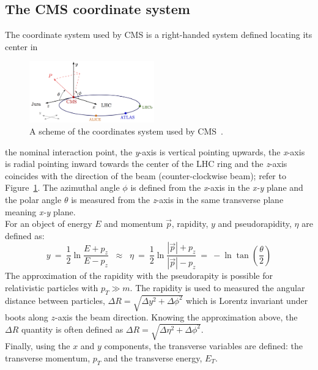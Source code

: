 \subsection{The CMS coordinate system} 
The coordinate system used by CMS is a right-handed system defined
locating its center in
\begin{figure}
  \begin{center}
    \includegraphics[clip,trim=0cm 0cm 0cm 0.1cm, width=0.48\textwidth]{Figures/c2/cms_coordinate_system.png}
  \end{center}
  \caption{A scheme of the coordinates system used by CMS~\cite{coordinate_cms}.}
\label{fig:coordinates}
\end{figure}
 the nominal interaction point, the
\emph{y}-axis is vertical pointing upwards, the \emph{x}-axis is
radial pointing inward towards the center of the LHC ring and the
\emph{z}-axis coincides with the direction of the beam
(counter-clockwise beam); refer to
Figure~\ref{fig:coordinates}. The azimuthal angle $\phi$ is defined
from the \emph{x}-axis in the \emph{x-y} plane and the polar angle
$\theta$ is measured from the \emph{z}-axis in the same transverse
plane meaning \emph{x-y} plane.\\
For an object of energy $E$ and momentum $\overrightarrow{p}$,
rapidity, $y$ and pseudorapidity, $\eta$ are defined as:
\begin{equation}
\label{eq:pseudo}
y \: = \: \frac{1}{2} \ln \frac{E + p_z}{E - p_z} \;\; \approx \;\;
\eta \: = \: \frac{1}{2} \ln \frac{|\overrightarrow{p}| +
  p_z}{|\overrightarrow{p}| - p_z} \: = \: -\ln \tan (\frac{\theta}{2})
\end{equation}
The approximation of the rapidity with the pseudorapity is possible for
relativistic particles with $p_{T} \gg m$. The rapidity is used to
measured the angular distance between particles, $\Delta R =
\sqrt{\Delta y ^2 + \Delta \phi ^2}$ which is Lorentz invariant under
boots along $z$-axis the beam direction. Knowing the approximation above,
the $\Delta R$ quantity is often defined as $\Delta R =
\sqrt{\Delta \eta ^2 + \Delta \phi ^2}$.\\
Finally, using the $x$ and $y$ components, the transverse variables
are defined: the transverse momentum, $p_T$ and the transverse energy,
$E_T$.


